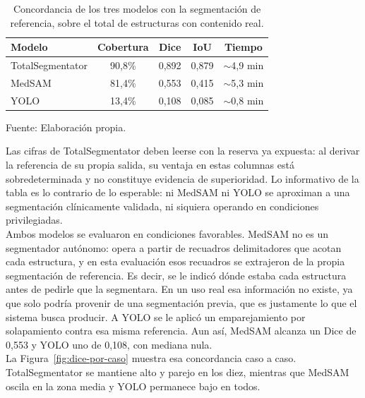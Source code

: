 \begin{table}[H]
  \centering
  \caption{Concordancia de los tres modelos con la segmentación de referencia, sobre el total de estructuras con contenido real.}
  \vspace{5pt}
  \label{tab:comparacion}
  \begin{tabular}{lcccc}
    \hline
    \textbf{Modelo} & \textbf{Cobertura} & \textbf{Dice} & \textbf{IoU} & \textbf{Tiempo} \\
    \hline
    TotalSegmentator & 90,8\% & 0,892 & 0,879 & $\sim$4,9 min \\
    MedSAM           & 81,4\% & 0,553 & 0,415 & $\sim$5,3 min \\
    YOLO      & 13,4\% & 0,108 & 0,085 & $\sim$0,8 min \\
    \hline
  \end{tabular}
  \begin{minipage}{\textwidth}
    \centering
    \vspace{5pt}
    \normalsize Fuente: Elaboración propia.\\
  \end{minipage}
\end{table}

Las cifras de TotalSegmentator deben leerse con la reserva ya expuesta: al derivar la referencia de su propia salida, su ventaja en estas columnas está sobredeterminada y no constituye evidencia de superioridad. Lo informativo de la tabla es lo contrario de lo esperable: ni MedSAM ni YOLO se aproximan a una segmentación clínicamente validada, ni siquiera operando en condiciones privilegiadas.\\

Ambos modelos se evaluaron en condiciones favorables. MedSAM no es un segmentador autónomo: opera a partir de recuadros delimitadores que acotan cada estructura, y en esta evaluación esos recuadros se extrajeron de la propia segmentación de referencia. Es decir, se le indicó dónde estaba cada estructura antes de pedirle que la segmentara. En un uso real esa información no existe, ya que solo podría provenir de una segmentación previa, que es justamente lo que el sistema busca producir. A YOLO se le aplicó un emparejamiento por solapamiento contra esa misma referencia. Aun así, MedSAM alcanza un Dice de 0,553 y YOLO uno de 0,108, con mediana nula.\\

La Figura~\ref{fig:dice-por-caso} muestra esa concordancia caso a caso. TotalSegmentator se mantiene alto y parejo en los diez, mientras que MedSAM oscila en la zona media y YOLO permanece bajo en todos.\\

